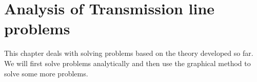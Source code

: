 \chapter{Analysis of Transmission line problems}\label{lec:lec14}
This chapter deals with solving problems based on the theory developed so far. We will first solve problems analytically and then use the graphical method to solve some more problems.

